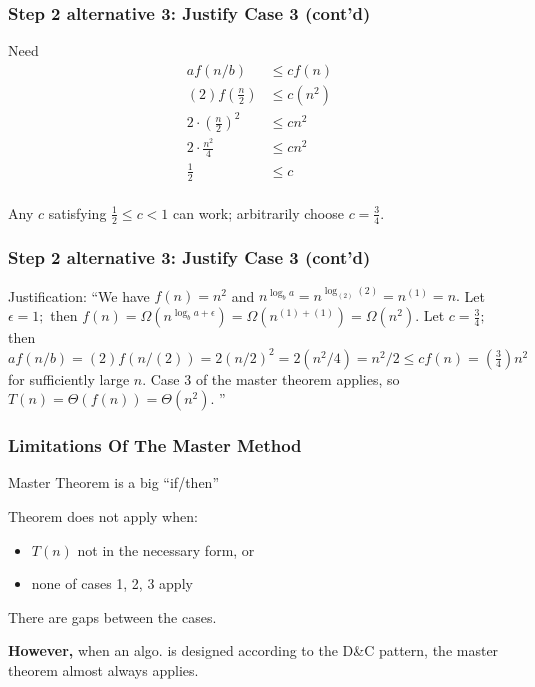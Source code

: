 \documentclass[10pt,aspectratio=169]{beamer}
\begin{document}
\begin{frame} \frametitle{Step 2 alternative 3: Justify Case 3 (cont'd)}
  Need
  \begin{align*}
    a f(n/b) &\leq cf(n) \\
    (2) f(\frac{n}{2}) &\leq c(n^2) \\
    2 \cdot (\frac{n}{2})^2 &\leq c n^2 \\
    2 \cdot \frac{n^2}{4} &\leq c n^2 \\
    \frac{1}{2} &\leq c \\
  \end{align*}

  Any $c$ satisfying $\frac{1}{2} \leq c < 1$ can work; arbitrarily choose $c=\frac{3}{4}.$
\end{frame}

\begin{frame} \frametitle{Step 2 alternative 3: Justify Case 3 (cont'd)}
 Justification: ``We have $f(n)=n^2$ and $n^{\log_b a} = n^{\log_{(2)} (2)} = n^{(1)} = n.$
 Let $\epsilon=1;$
  then $f(n) = \Omega(n^{\log_b a + \epsilon}) = \Omega(n^{(1)+(1)}) = \Omega(n^2).$
 Let $c=\frac{3}{4};$ then
  $af(n/b) = (2)f(n/(2)) = 2(n/2)^2 = 2(n^2/4) = n^2/2 \leq cf(n) = (\frac{3}{4})n^2$ for sufficiently large $n$.
  Case 3 of the master theorem applies, so $T(n)=\Theta(f(n)) = \Theta(n^2).$ ''
 \end{frame}

 \begin{frame} \frametitle{Limitations Of The Master Method}
  Master Theorem is a big ``if/then''
  \vspace{10pt}

Theorem does not apply when:
\begin{itemize}
  \item $T(n)$ not in the necessary form, or
  \item none of cases 1, 2, 3 apply
\end{itemize}
\vspace{10pt}

There are gaps between the cases.
\vspace{10pt}

\textbf{However,} when an algo. is designed according to the D\&C pattern, the master theorem almost always applies.

\end{frame}
 
\end{document}
